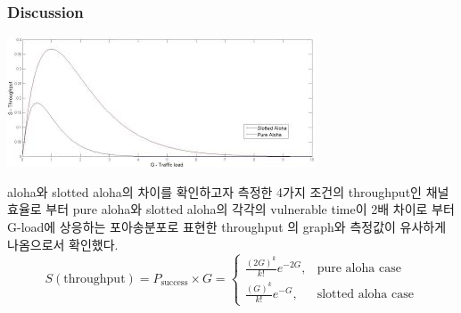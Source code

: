 \subsubsection{Discussion}
\begin{multicols}{2}
    \begin{minipage}{\columnwidth}
    \vspace{2mm}
    \centering%
    \includegraphics[width=.99\textwidth]{image/week12/1-3.png}
    \vspace{-2mm}
        \vspace{-4mm}
    \end{minipage}
    
    \columnbreak
    
    aloha와 slotted aloha의 차이를 확인하고자 측정한 4가지 조건의 throughput인 채널효율로 부터 pure aloha와 slotted aloha의 각각의 vulnerable time이 2배 차이로 부터 G-load에 상응하는 포아송분포로 표현한 throughput 의 graph와 측정값이 유사하게 나옴으로서 확인했다.
    $$
    S(\text{throughput})= P_{\text{success}} \times G =
    \begin{cases}
    \frac{(2G)^k}{k!}e^{-2G}, & \mbox{pure aloha case}\\
    \frac{(G)^k}{k!}e^{-G}, & \mbox{slotted aloha case}
    \end{cases}
    $$
    \vspace{-4mm}
\end{multicols}
\vspace{-3mm}


